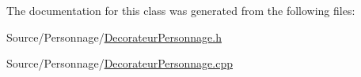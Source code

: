 The documentation for this class was generated from the following files\-:\begin{DoxyCompactItemize}
\item 
Source/\-Personnage/\hyperlink{DecorateurPersonnage_8h}{Decorateur\-Personnage.\-h}\item 
Source/\-Personnage/\hyperlink{DecorateurPersonnage_8cpp}{Decorateur\-Personnage.\-cpp}\end{DoxyCompactItemize}
